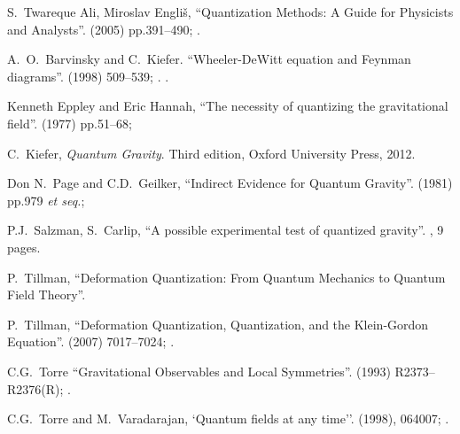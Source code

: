 \begin{thebibliography}{99}
S.~Twareque Ali, Miroslav Engli\v{s},
``Quantization Methods: A Guide for Physicists and Analysts''.
  (2005) pp.391--490;
.\\
{\tt{}}

A.~O.~Barvinsky and C.~Kiefer.
``Wheeler-DeWitt equation and Feynman diagrams''.
  (1998) 509--539; .\newline
{\tt{}}.

 Kenneth Eppley and Eric Hannah,
``The necessity of quantizing the gravitational field''.
  (1977) pp.51--68;
{\tt{}}

C.~Kiefer,
\textit{Quantum Gravity}.
Third edition, Oxford University Press, 2012.

 Don N.~Page and C.D.~Geilker,
``Indirect Evidence for Quantum Gravity''.
  (1981) pp.979 \emph{et seq.};
{\tt{}}

 P.J.~Salzman, S.~Carlip,
``A possible experimental test of quantized gravity''. , 9 pages.

 P.~Tillman, ``Deformation Quantization: From Quantum Mechanics to
Quantum Field Theory''. 

 P.~Tillman, ``Deformation Quantization, Quantization, and the
Klein-Gordon Equation''.
  (2007) 7017--7024; .\\
{\tt{}}

C.G.~Torre
``Gravitational Observables and Local Symmetries''.
  (1993) R2373--R2376(R); .\newline
{\tt{}}

C.G.~Torre and M.~Varadarajan,
`Quantum fields at any time''.
  (1998), 064007; .\newline
{\tt{}}


\end{thebibliography}
